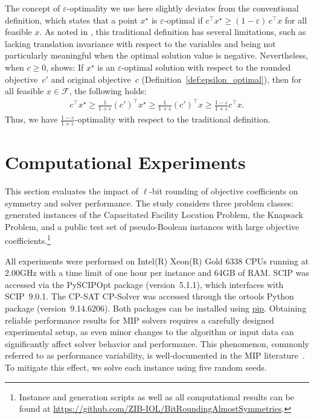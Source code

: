 \documentclass[runningheads]{llncs}
\newcommand{\T}{^\top}
\newcommand{\F}{\mathcal{F}}
\begin{document}
The concept of $\varepsilon$-optimality we use here slightly deviates from the conventional definition, which states that a point $x^\star$ is $\varepsilon$-optimal if $c\T x^\star \geq (1-\varepsilon)\, c\T x$ for all feasible $x$. As noted in \cite{orlin2008}, this traditional definition has several limitations, such as lacking translation invariance with respect to the variables and being not particularly meaningful when the optimal solution value is negative. Nevertheless, when $c \geq 0$, \cite[Lemma 4.1]{orlin2008} shows: If $x^\star$ is an $\varepsilon$-optimal solution with respect to the rounded objective~$c'$ and original objective~$c$ (Definition~\ref{def:epsilon_optimal}), then for all feasible $x \in \F$, the following holds:
\begin{align*}
  c\T x^\star \geq \frac{1}{1+\varepsilon} (c')\T x^\star \geq \frac{1}{1+\varepsilon} (c')\T x \geq \frac{1-\varepsilon}{1+\varepsilon} c\T x.
\end{align*}
Thus, we have $\frac{1-\varepsilon}{1+\varepsilon}$-optimality with respect to the traditional definition.

\section{Computational Experiments}
\label{sec:experiments}

This section evaluates the impact of $\ell$-bit rounding of objective coefficients on symmetry and solver performance. The study considers three problem classes: generated instances of the Capacitated Facility Location Problem, the Knapsack Problem, and a public test set of pseudo-Boolean instances with large objective coefficients.\footnote{Instance and generation scripts as well as all computational results can be found at \url{https://github.com/ZIB-IOL/BitRoundingAlmostSymmetries}.}

All experiments were performed on Intel(R) Xeon(R) Gold 6338 CPUs running at 2.00GHz with a time limit of one hour per instance and 64GB of RAM. SCIP was accessed via the PySCIPOpt package (version~5.1.1), which interfaces with SCIP~9.0.1.
The CP-SAT CP-Solver was accessed through the ortools Python package (version~9.14.6206). Both packages can be installed using \href{https://pypi.org/project/pip}{pip}. 
Obtaining reliable performance results for MIP solvers requires a carefully designed experimental setup, as even minor changes to the algorithm or input data can significantly affect solver behavior and performance. This phenomenon, commonly referred to as performance variability, is well-documented in the MIP literature~\cite{lodi2013performance}. To mitigate this effect, we solve each instance using five random seeds. %
\end{document}
